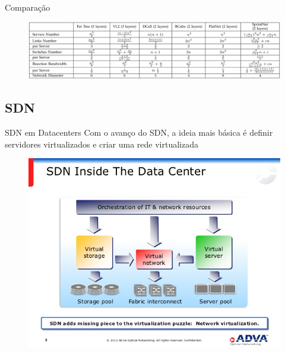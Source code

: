 \documentclass[aspectratio=169]{beamer}
\begin{document}
		\begin{frame} {Comparação}
			\begin{figure}[ht]   
				\includegraphics[scale=0.35]{imagens/tabela.png}
				\label{fig:sample_figure}
			\end{figure}
		\end{frame}

		\subsection{SDN}
		
		\begin{frame} {SDN em Datacenters}
			Com o avanço do SDN, a ideia mais básica é definir servidores virtualizados e criar uma rede virtualizada
			\begin{figure}[ht]   
				\includegraphics[scale=0.35]{imagens/inside-sdn.jpg}
				\label{fig:sample_figure}
			\end{figure}
		\end{frame}
\end{document}
